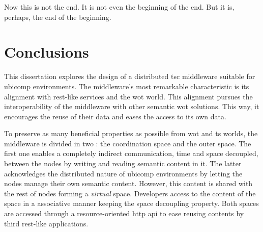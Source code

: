 
\begin{savequote}[50mm]
Now this is not the end.
It is not even the beginning of the end.
But it is, perhaps, the end of the beginning.
\end{savequote}


\chapter{Conclusions}
\label{cha:conclusions}
\newcommand{\pathchapseven}{7_conclusion}


\ifpdf
    \graphicspath{{\pathchapseven/figures/PNG/}{\pathchapseven/figures/PDF/}{\pathchapseven/figures/}}
\else
    \graphicspath{{\pathchapseven/figures/EPS/}{\pathchapseven/figures/}}
\fi




This dissertation explores the design of a distributed \ac{tsc} middleware suitable for \ac{ubicomp} environments.
The middleware's most remarkable characteristic is its alignment with \ac{rest}-like services and the \ac{wot} world.
This alignment pursues the interoperability of the middleware with other semantic \ac{wot} solutions.
This way, it encourages the reuse of their data and eases the access to its own data.


To preserve as many beneficial properties as possible from \ac{wot} and \ac{ts} worlds, the middleware is divided in two \Spaces{}: the coordination space and the outer space. %
The first one enables a completely indirect communication, time and space decoupled, between the nodes by writing and reading semantic content in it.
The latter acknowledges the distributed nature of \ac{ubicomp} environments by letting the nodes manage their own semantic content.
However, this content is shared with the rest of nodes forming a \emph{virtual} space.
Developers access to the content of the space in a associative manner keeping the space decoupling property.
Both spaces are accessed through a resource-oriented \ac{http} \ac{api} to ease reusing contents by third \ac{rest}-like applications. %


